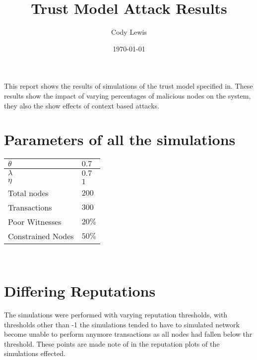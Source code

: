 \documentclass{article}
\title{Trust Model Attack Results}
\author{Cody Lewis}
\date{\today}
\begin{document}
  \maketitle
  \tableofcontents
  \newpage
  This report shows the results of simulations of the trust model specified
  in\cite{saied13}. These results show the impact of varying percentages of
  malicious nodes on the system, they also the show effects of context based
  attacks.
  \section{Parameters of all the simulations}
    \begin{tabularx}{\textwidth}{X X}
        \toprule
        $ \theta{} $ & $ 0.7 $ \\
        \midrule
        $ \lambda{} $ & $ 0.7 $ \\
        \midrule
        $ \eta{} $ & $ 1 $ \\
        \midrule
        Total nodes & $ 200 $ \\
        \midrule
        Transactions & $ 300 $ \\
        \midrule
        Poor Witnesses & $ 20\% $ \\
        \midrule
        Constrained Nodes & $ 50\% $ \\
        \bottomrule
    \end{tabularx} \\

    \section{Differing Reputations}
    The simulations were performed with varying reputation thresholds,
    with thresholds other than -1 the simulations tended to have to simulated
    network become unable to perform anymore transactions as all nodes had
    fallen below thr threshold. These points are made note of in the
    reputation plots of the simulations effected.\
\end{document}
